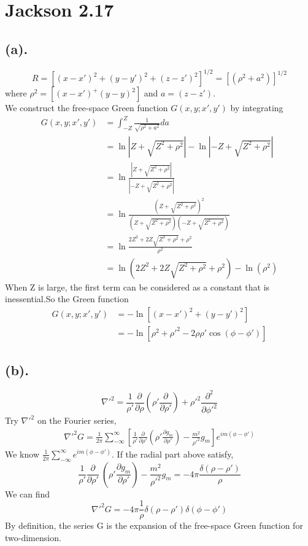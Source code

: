 \documentclass[notitlepage]{revtex4-1}
\newcommand{\pd}[2]{\frac{\partial#1}{\partial#2}}
\begin{document}
\section*{Jackson 2.17}
\subsection*{(a).}
\[ R=[(x-x')^2+(y-y')^2+(z-z')^2]^{1/2}=[(\rho^2+a^2)]^{1/2} \]
where $\rho^2=[(x-x')^+(y-y)^2]$ and $a=(z-z')$.\\
We construct the free-space Green function $G(x,y; x',y')$ by integrating
\begin{align*}
  G(x,y;x',y')&=\int^Z_{-Z}\frac{1}{\sqrt{\rho^2+a^2}}da\\
              &=\ln|Z+\sqrt{Z^2+\rho^2}|-\ln|-Z+\sqrt{Z^2+\rho^2}|\\
              &=\ln\frac{|Z+\sqrt{Z^2+\rho^2}|}{|-Z+\sqrt{Z^2+\rho^2}|}\\
              &=\ln\frac{(Z+\sqrt{Z^2+\rho^2})^2}{(Z+\sqrt{Z^2+\rho^2})(-Z+\sqrt{Z^2+\rho^2})}\\
              &=\ln\frac{2Z^2+2Z\sqrt{Z^2+\rho^2}+\rho^2}{\rho^2}\\
              &=\ln(2Z^2+2Z\sqrt{Z^2+\rho^2}+\rho^2)-\ln(\rho^2)
\end{align*}
When Z is large, the first term can be considered as a constant that is inessential.So the Green function
\begin{align*}
  G(x,y;x',y')&=-\ln[(x-x')^2+(y-y')^2]\\
              &=-\ln[\rho^2+\rho'^2-2\rho\rho'\cos(\phi-\phi')]
\end{align*}\par
\subsection*{(b).}
\[\nabla'^2=\frac{1}{\rho'}\pd{}{\rho}(\rho'\pd{}{\rho'})+\rho'^2\pd{^2}{\phi'^2}\]
Try $\nabla'^2$ on the Fourier series,
\begin{align*}
  \nabla'^2 G=\frac{1}{2\pi}\sum^{\infty}_{-\infty}[\frac{1}{\rho'}\pd{}{\rho'}(\rho'\pd{g_m}{\rho'})-\frac{m^2}{\rho'^2}g_m]e^{im(\phi-\phi')}
\end{align*}
We know $\frac{1}{2\pi}\sum^{\infty}_{-\infty}e^{im(\phi-\phi')}$. If the radial part above satisfy,
\[\frac{1}{\rho'}\pd{}{\rho'}\
  (\rho'\pd{g_m}{\rho'})-\frac{m^2}{\rho'^2}g_m=-4\pi\frac{\delta(\rho-\rho')}{\rho} \]
We can find
\[ \nabla'^2 G=-4\pi\frac{1}{\rho}\delta(\rho-\rho')\delta(\phi-\phi')\]
By definition, the series G is the expansion of the free-space Green function for two-dimension.\par
\end{document}
